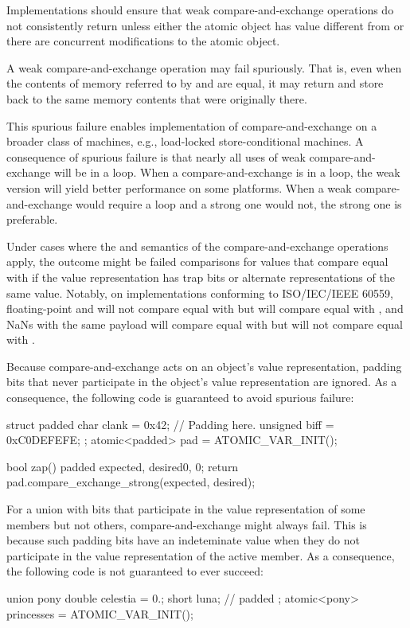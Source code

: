 \begin{itemdescr}
\pnum
Implementations should ensure that weak compare-and-exchange operations do not
consistently return  unless either the atomic object has value
different from  or there are concurrent modifications to the
atomic object.

\pnum
\remarks
A weak compare-and-exchange operation may fail spuriously. That is, even when
the contents of memory referred to by  and  are
equal, it may return  and store back to  the same memory
contents that were originally there.
\begin{note} This
spurious failure enables implementation of compare-and-exchange on a broader class of
machines, e.g., load-locked store-conditional machines. A
consequence of spurious failure is that nearly all uses of weak compare-and-exchange
will be in a loop.
When a compare-and-exchange is in a loop, the weak version will yield better performance
on some platforms. When a weak compare-and-exchange would require a loop and a strong one
would not, the strong one is preferable.
\end{note}

\pnum
\begin{note}
Under cases where the  and  semantics of the compare-and-exchange
operations apply, the outcome might be failed comparisons for values that compare equal with
 if the value representation has trap bits or alternate
representations of the same value. Notably, on implementations conforming to
ISO/IEC/IEEE 60559, floating-point  and 
will not compare equal with  but will compare equal with ,
and NaNs with the same payload will compare equal with  but will not
compare equal with .
\end{note}
\begin{note}
Because compare-and-exchange acts on an object's value representation,
padding bits that never participate in the object's value representation
are ignored. As a consequence, the following code is guaranteed to avoid
spurious failure:
\begin{codeblock}
struct padded {
  char clank = 0x42;
  // Padding here.
  unsigned biff = 0xC0DEFEFE;
};
atomic<padded> pad = ATOMIC_VAR_INIT({});

bool zap() {
  padded expected, desired{0, 0};
  return pad.compare_exchange_strong(expected, desired);
}
\end{codeblock}
\end{note}
\begin{note}
For a union with bits that participate in the value representation
of some members but not others, compare-and-exchange might always fail.
This is because such padding bits have an indeteminate value when they
do not participate in the value representation of the active member.
As a consequence, the following code is not guaranteed to ever succeed:
%
\begin{codeblock}
union pony {
  double celestia = 0.;
  short luna; // padded
};
atomic<pony> princesses = ATOMIC_VAR_INIT({});


\end{codeblock}
\end{note}
\end{itemdescr}
